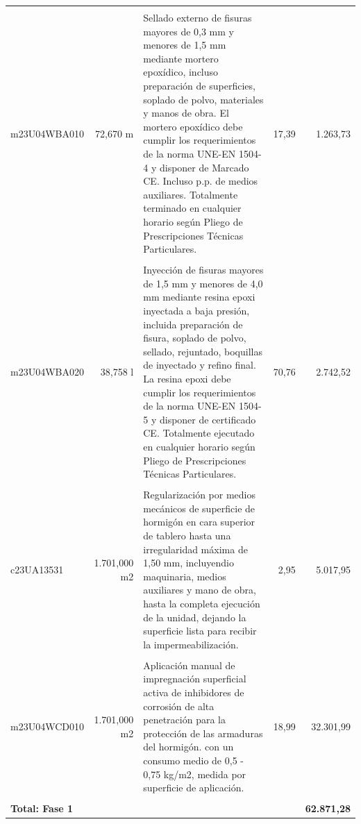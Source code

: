 \documentclass{book}%
\begin{document}
\begin{longtable}{lrlrr}
&&&&\\%
m23U04WBA010&    72,670 m&\multicolumn{1}{p{5cm}}{Sellado externo de fisuras mayores de 0,3 mm y menores de 1,5 mm mediante mortero epoxídico, incluso preparación de superficies, soplado de polvo, materiales y manos de obra. El mortero epoxídico debe cumplir los requerimientos de la norma UNE{-}EN 1504{-}4 y disponer de Marcado CE. Incluso p.p. de medios auxiliares. Totalmente terminado en cualquier horario según Pliego de Prescripciones Técnicas Particulares.}&     17,39&1.263,73\\%
&&&&\\%
m23U04WBA020&    38,758 l&\multicolumn{1}{p{5cm}}{Inyección de fisuras mayores de 1,5 mm y menores de 4,0 mm mediante resina epoxi inyectada a baja presión, incluida preparación de fisura, soplado de polvo, sellado, rejuntado, boquillas de inyectado y refino final. La resina epoxi debe cumplir los requerimientos de la norma UNE{-}EN 1504{-}5 y disponer de certificado CE. Totalmente ejecutado en cualquier horario según Pliego de Prescripciones Técnicas Particulares.}&     70,76&2.742,52\\%
&&&&\\%
c23UA13531& 1.701,000 m2&\multicolumn{1}{p{5cm}}{Regularización por medios mecánicos de superficie de hormigón en cara superior de tablero hasta una irregularidad máxima de 1,50 mm, incluyendio maquinaria, medios auxiliares y mano de obra, hasta la completa ejecución de la unidad, dejando la superficie lista para recibir la impermeabilización.}&      2,95&5.017,95\\%
&&&&\\%
m23U04WCD010& 1.701,000 m2&\multicolumn{1}{p{5cm}}{Aplicación manual de impregnación superficial activa de inhibidores de corrosión de alta penetración para la protección de las armaduras del hormigón. con un consumo medio de 0,5 {-} 0,75 kg/m2, medida por superficie de aplicación.}&     18,99&32.301,99\\%
&&&&\\%
\multicolumn{4}{p{8cm}}{\textbf{Total: Fase 1}}&\textbf{62.871,28}\\%
\end{longtable}%
\normalsize

%
\end{document}

